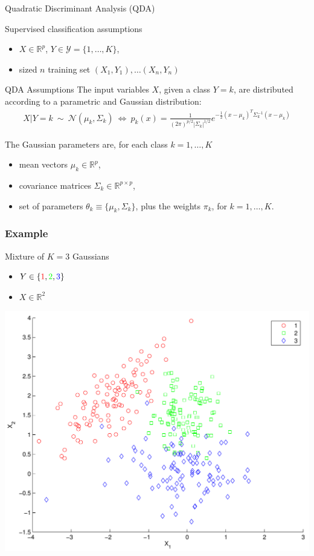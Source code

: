 \documentclass[compress, smaller, serif, 9pt]{beamer}
\newcommand{\structuretext}[1]{{\usebeamercolor[fg]{structure} #1}}
\newcommand{\doigt}{\structuretext{\noindent \Pisymbol{pzd}{43}}}
\begin{document}
\begin{frame}{Quadratic Discriminant Analysis (QDA)}
\begin{block}{Supervised classification assumptions}
 \begin{itemize}
  \item $X \in \mathbb{R}^p$, $Y \in \mathcal{Y}=\{1,\ldots,K\}$,
  \item sized $n$ training set $(X_1,Y_1), \ldots (X_n,Y_n)$
 \end{itemize}
\end{block}

\begin{block}{QDA Assumptions}
The input variables $X$, given a class $Y=k$, are distributed according to a parametric and Gaussian distribution:
\begin{align*}
 X|Y=k \ \sim \ \mathcal{N}(\mu_k,\Sigma_k) \  \Leftrightarrow \ p_k(x)= \frac{1}{(2 \pi)^{p/2} |\Sigma_k|^{1/2}}e^{-\frac{1}{2}
 (x-\mu_k)^T \Sigma_k^{-1} (x-\mu_k)}
\end{align*}
\end{block}
The Gaussian parameters are, for each class $k=1,\ldots,K$
\begin{itemize}
 \item mean vectors $\mu_k \in \mathbb{R}^p$,
 \item covariance matrices $\Sigma_k \in \mathbb{R}^{p \times p}$,
 \item[\doigt] set of parameters $\theta_k \equiv \{\mu_k, \Sigma_k\}$, plus the weights $\pi_k$, for $k=1,\ldots,K$.
\end{itemize}

\end{frame}



\begin{frame}
  \frametitle{Example}
\begin{block}{Mixture of $K=3$ Gaussians}
\begin{itemize}
   \item $Y \in \{\textcolor{red}{1},\textcolor{green}{2},\textcolor{blue}{3}\}$
   \item $X \in \mathbb{R}^2$
\end{itemize}
\end{block}
\vspace*{-8mm}

\begin{center}
  \includegraphics[width=.65\textwidth]{discr_analysis_ex.pdf}
\end{center}

\end{frame}
\end{document}

